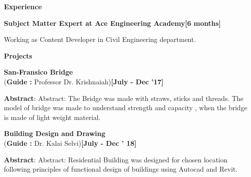 \documentclass[a4paper,10pt]{article}
\begin{document}
\colorbox{titleColor}{\parbox{6.7in}{\textbf{Experience}}}

\begin{itemize*}
\setlength{\itemsep}{1pt}
\item \textbf{Subject Matter Expert at Ace Engineering Academy}\hfill {\small{{\textbf{[6 months]}}\/}}
\begin{itemize*}

            \item Working as Content Developer in Civil Engineering department. 

            \end{itemize*}

            \end{itemize*}

\colorbox{titleColor}{\parbox{6.7in}{\textbf{Projects}}}

\begin{itemize*}
\setlength{\itemsep}{1pt}
\item \textbf{San-Fransico Bridge}
 \\ {(\textbf{Guide :} Professor Dr. Krishnaiah)}\hfill {\small{{\textbf{[July - Dec '17]}}\/}}
\begin{itemize*}
\setlength{\itemsep}{.00pt}

            \item \textbf{Abstract}: Abstract: The Bridge was made with straws, sticks and threads. The model of bridge was made to
understand strength and capacity , when the bridge is made of light weight material. 

            \end{itemize*} 

            \end{itemize*} 

\begin{itemize*}
\setlength{\itemsep}{1pt}
\item \textbf{Building Design and Drawing}
 \\ {(\textbf{Guide :} Dr. Kalai Selvi)}\hfill {\small{{\textbf{[July - Dec ' 18]}}\/}}
\begin{itemize*}
\setlength{\itemsep}{.00pt}

            \item \textbf{Abstract}: Abstract: Residential Building was designed for chosen location following principles of functional design
of buildings using Autocad and Revit.
 

            \end{itemize*} 

            \end{itemize*} 
\end{document}
